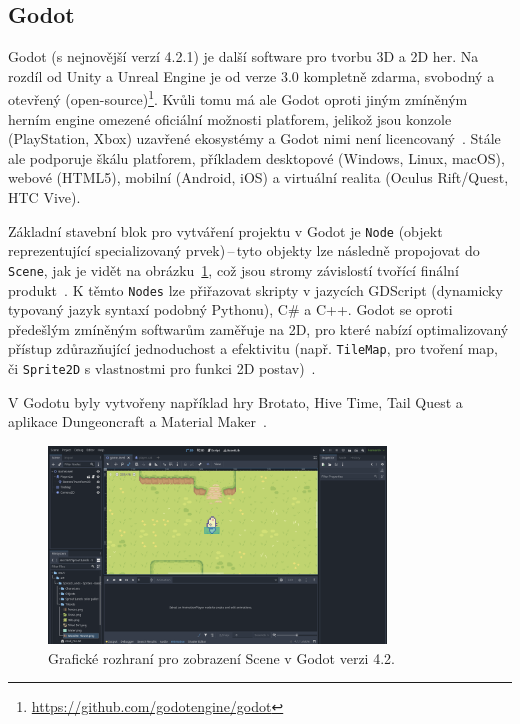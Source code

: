 \subsection*{Godot}
Godot (s nejnovější verzí 4.2.1) je další software pro tvorbu 3D a 2D her. Na rozdíl od Unity a Unreal Engine je od verze 3.0 kompletně zdarma, svobodný a otevřený (open-source)\footnote{\url{https://github.com/godotengine/godot}}. Kvůli tomu má ale Godot oproti jiným zmíněným herním engine omezené oficiální možnosti platforem, jelikož jsou konzole (PlayStation, Xbox) uzavřené ekosystémy a Godot nimi není licencovaný~\cite{Godot_Engine_consoles}. Stále ale podporuje škálu platforem, příkladem desktopové (Windows, Linux, macOS), webové (HTML5), mobilní (Android, iOS) a virtuální realita (Oculus Rift/Quest, HTC Vive).

Základní stavební blok pro vytváření projektu v Godot je \verb|Node| (objekt reprezentující specializovaný prvek)\,--\,tyto objekty lze následně propojovat do \verb|Scene|, jak je vidět na obrázku~\ref{fig:godot_view}, což jsou stromy závislostí tvořící finální produkt~\cite{bradfield2018godot}. K těmto \verb|Nodes| lze přiřazovat skripty v jazycích GDScript (dynamicky typovaný jazyk syntaxí podobný Pythonu), C\# a C++\cite{GameEngineWizardry}. Godot se oproti předešlým zmíněným softwarům zaměřuje na 2D, pro které nabízí optimalizovaný přístup zdůrazňující jednoduchost a efektivitu (např. \verb|TileMap|, pro tvoření map, či \verb|Sprite2D| s vlastnostmi pro funkci 2D postav)~\cite{Godot_Engine}.

V Godotu byly vytvořeny například hry Brotato, Hive Time, Tail Quest a aplikace Dungeoncraft a Material Maker~\cite{Godot_Engine}.
\begin{figure}[H]
	\centering
	\includegraphics[width=0.8\textwidth]{obrazky-figures/ch2/godot_view.png}
	\caption{Grafické rozhraní pro zobrazení Scene v Godot verzi 4.2.}
	\label{fig:godot_view}
\end{figure}

